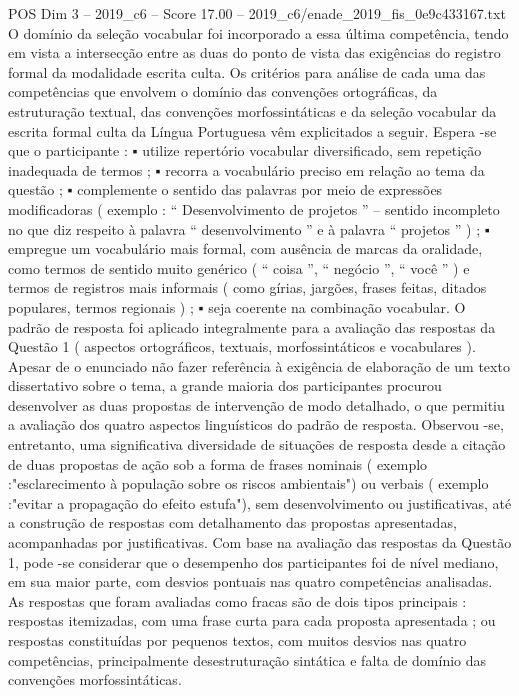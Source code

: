 \begin{textsample}{POS Dim 3 – 2019\_c6 – Score 17.00 – 2019\_c6/enade\_2019\_fis\_0e9c433167.txt}
O domínio da seleção vocabular foi incorporado a essa última competência, tendo em vista a intersecção entre as duas do ponto de vista das exigências do registro formal da modalidade escrita culta.
Os critérios para análise de cada uma das competências que envolvem o domínio das convenções ortográficas, da estruturação textual, das convenções morfossintáticas e da seleção vocabular da escrita formal culta da Língua Portuguesa vêm explicitados a seguir.
Espera -se que o participante : {\EmojiFont ▪} utilize repertório vocabular diversificado, sem repetição inadequada de termos ; {\EmojiFont ▪} recorra a vocabulário preciso em relação ao tema da questão ; {\EmojiFont ▪} complemente o sentido das palavras por meio de expressões modificadoras ( exemplo : “ Desenvolvimento de projetos ” – sentido incompleto no que diz respeito à palavra “ desenvolvimento ” e à palavra “ projetos ” ) ; {\EmojiFont ▪} empregue um vocabulário mais formal, com ausência de marcas da oralidade, como termos de sentido muito genérico ( “ coisa ”, “ negócio ”, “ você ” ) e termos de registros mais informais ( como gírias, jargões, frases feitas, ditados populares, termos regionais ) ; {\EmojiFont ▪} seja coerente na combinação vocabular.
O padrão de resposta foi aplicado integralmente para a avaliação das respostas da Questão 1 ( aspectos ortográficos, textuais, morfossintáticos e vocabulares ).
Apesar de o enunciado não fazer referência à exigência de elaboração de um texto dissertativo sobre o tema, a grande maioria dos participantes procurou desenvolver as duas propostas de intervenção de modo detalhado, o que permitiu a avaliação dos quatro aspectos linguísticos do padrão de resposta.
Observou -se, entretanto, uma significativa diversidade de situações de resposta desde a citação de duas propostas de ação sob a forma de frases nominais ( exemplo :"esclarecimento à população sobre os riscos ambientais") ou verbais ( exemplo :"evitar a propagação do efeito estufa"), sem desenvolvimento ou justificativas, até a construção de respostas com detalhamento das propostas apresentadas, acompanhadas por justificativas.
Com base na avaliação das respostas da Questão 1, pode -se considerar que o desempenho dos participantes foi de nível mediano, em sua maior parte, com desvios pontuais nas quatro competências analisadas.
As respostas que foram avaliadas como fracas são de dois tipos principais : respostas itemizadas, com uma frase curta para cada proposta apresentada ; ou respostas constituídas por pequenos textos, com muitos desvios nas quatro competências, principalmente desestruturação sintática e falta de domínio das convenções morfossintáticas.

\end{textsample}
